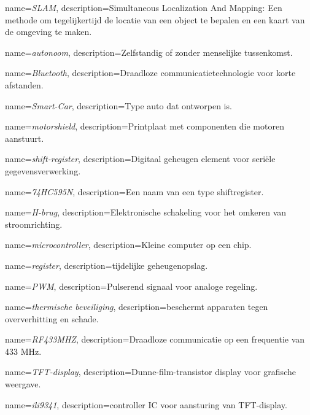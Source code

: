 \printglossaries
{}
{
    name=\textit{SLAM},
    description={Simultaneous Localization And Mapping: Een methode om tegelijkertijd de locatie van een object te bepalen en een kaart van de omgeving te maken.}
}

{
    name=\textit{autonoom},
    description={Zelfstandig of zonder menselijke tussenkomst.}
}

{
    name=\textit{Bluetooth},
    description={Draadloze communicatietechnologie voor korte afstanden.}
}

{
    name=\textit{Smart-Car},
    description={Type auto dat ontworpen is.}
}

{
    name=\textit{motorshield},
    description={Printplaat met componenten die motoren aanstuurt.}
}

{
    name=\textit{shift-register},
    description={Digitaal geheugen element voor seriële gegevensverwerking.}
}

{
    name=\textit{74HC595N},
    description={Een naam van een type shiftregister.}
}

{
    name=\textit{H-brug},
    description={Elektronische schakeling voor het omkeren van stroomrichting.}
}

{
    name=\textit{microcontroller},
    description={Kleine computer op een chip.}
}

{
    name=\textit{register},
    description={tijdelijke geheugenopslag.}
}

{
    name=\textit{PWM},
    description={Pulserend signaal voor analoge regeling.}
}

{
    name=\textit{thermische beveiliging},
    description={beschermt apparaten tegen oververhitting en schade.}
}

{
    name=\textit{RF433MHZ},
    description={Draadloze communicatie op een frequentie van 433 MHz.}
}

{
    name=\textit{TFT-display},
    description={Dunne-film-transistor display voor grafische weergave.}
}

{
    name=\textit{ili9341},
    description={controller IC voor aansturing van TFT-display.}
}

